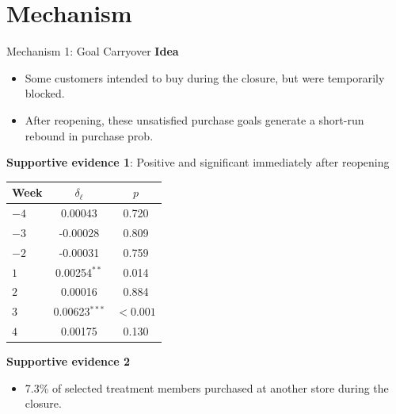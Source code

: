 \documentclass[aspectratio=169]{beamer}  %
\begin{document}
\section{Mechanism}
\begin{frame}{Mechanism 1: Goal Carryover}
\footnotesize
\textbf{Idea}
\begin{itemize}
    \item Some customers intended to buy during the closure, but were temporarily blocked.
    \item After reopening, these unsatisfied purchase goals generate a short-run rebound in purchase prob.
\end{itemize}

\textbf{Supportive evidence 1}: Positive and significant immediately after reopening

\begin{table}
\scriptsize
\centering
\begin{tabular}{lcc}
\toprule
Week & $\delta_\ell$ & $p$ \\
\midrule
$-4$ & 0.00043 & 0.720 \\
$-3$ & -0.00028 & 0.809 \\
$-2$ & -0.00031 & 0.759 \\
$1$  & 0.00254$^{**}$ & 0.014 \\
$2$  & 0.00016 & 0.884 \\
$3$  & 0.00623$^{***}$ & $<0.001$ \\
$4$  & 0.00175 & 0.130 \\
\bottomrule
\end{tabular}
\end{table}

\textbf{Supportive evidence 2}
\begin{itemize}
    \item 7.3\% of selected treatment members purchased at another store during the closure.
\end{itemize}
\end{frame}
\end{document}
